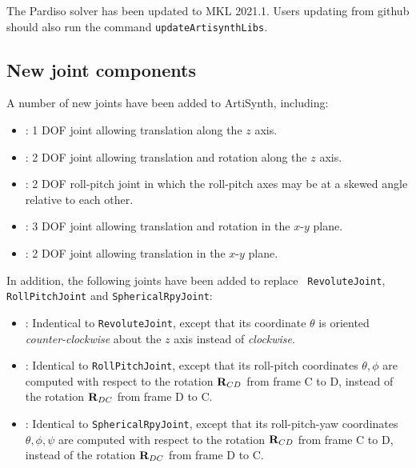 \documentclass{article}
\def\R{{\bf R}}
\begin{document}
The Pardiso solver has been updated to MKL 2021.1. Users updating from
github should also run the command {\tt updateArtisynthLibs}.

\subsection*{New joint components}

A number of new joints have been added to ArtiSynth, including:

\begin{itemize}

\item
{}:
1 DOF joint allowing translation along the
$z$ axis.

\item
{}:
2 DOF joint allowing translation and
rotation along the $z$ axis.

\item
{}: 
2 DOF roll-pitch joint in which the roll-pitch axes may be at a
skewed angle relative to each other.

\item
{}:
3 DOF joint allowing translation and
rotation in the $x$-$y$ plane.

\item
{}: 
2 DOF joint allowing translation
in the $x$-$y$ plane.

\end{itemize}

In addition, the following joints have been added to replace {\tt
RevoluteJoint}, {\tt RollPitchJoint} and {\tt SphericalRpyJoint}:

\begin{itemize}

\item {}: Indentical to
{\tt RevoluteJoint}, except that its coordinate $\theta$ is oriented
{\it counter-clockwise} about the $z$ axis instead of {\it clockwise}.

\item
{}:
Identical to {\tt RollPitchJoint}, except
that its roll-pitch coordinates $\theta, \phi$ are computed with
respect to the rotation $\R_{CD}$ from frame C to D, instead of the
rotation $\R_{DC}$ from frame D to C.

\item {}:
Identical to {\tt SphericalRpyJoint}, except that its roll-pitch-yaw
coordinates $\theta, \phi, \psi$ are computed with respect to the
rotation $\R_{CD}$ from frame C to D, instead of the rotation
$\R_{DC}$ from frame D to C.

\end{itemize}
\end{document}
